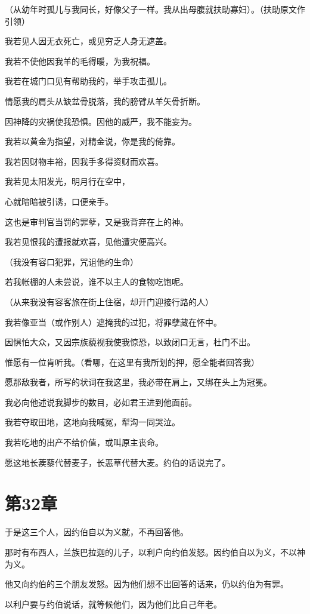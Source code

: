 \documentclass[12pt,oneside]{book}
\begin{document}
（从幼年时孤儿与我同长，好像父子一样。我从出母腹就扶助寡妇）。（扶助原文作引领）

我若见人因无衣死亡，或见穷乏人身无遮盖。

我若不使他因我羊的毛得暖，为我祝福。

我若在城门口见有帮助我的，举手攻击孤儿。

情愿我的肩头从缺盆骨脱落，我的膀臂从羊矢骨折断。

因神降的灾祸使我恐惧。因他的威严，我不能妄为。

我若以黄金为指望，对精金说，你是我的倚靠。

我若因财物丰裕，因我手多得资财而欢喜。

我若见太阳发光，明月行在空中，

心就暗暗被引诱，口便亲手。

这也是审判官当罚的罪孽，又是我背弃在上的神。

我若见恨我的遭报就欢喜，见他遭灾便高兴。

（我没有容口犯罪，咒诅他的生命）

若我帐棚的人未尝说，谁不以主人的食物吃饱呢。

（从来我没有容客旅在街上住宿，却开门迎接行路的人）

我若像亚当（或作别人）遮掩我的过犯，将罪孽藏在怀中。

因惧怕大众，又因宗族藐视我使我惊恐，以致闭口无言，杜门不出。

惟愿有一位肯听我。（看哪，在这里有我所划的押，愿全能者回答我）

愿那敌我者，所写的状词在我这里，我必带在肩上，又绑在头上为冠冕。

我必向他述说我脚步的数目，必如君王进到他面前。

我若夺取田地，这地向我喊冤，犁沟一同哭泣。

我若吃地的出产不给价值，或叫原主丧命。

愿这地长蒺藜代替麦子，长恶草代替大麦。约伯的话说完了。


\chapter{第32章}
于是这三个人，因约伯自以为义就，不再回答他。

那时有布西人，兰族巴拉迦的儿子，以利户向约伯发怒。因约伯自以为义，不以神为义。

他又向约伯的三个朋友发怒。因为他们想不出回答的话来，仍以约伯为有罪。

以利户要与约伯说话，就等候他们，因为他们比自己年老。
\end{document}
